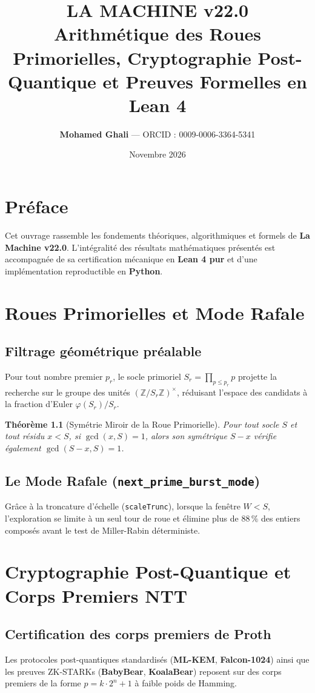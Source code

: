 \documentclass[11pt,a4paper,openany]{book}
\title{\Huge \textbf{LA MACHINE v22.0}\\[0.4cm]
\Large Arithmétique des Roues Primorielles, Cryptographie Post-Quantique et Preuves Formelles en Lean 4}
\author{\textbf{Mohamed Ghali} — ORCID : 0009-0006-3364-5341}
\date{Novembre 2026}
\newtheorem{theoreme}{Théorème}[chapter]
\begin{document}
\frontmatter
\maketitle
\tableofcontents
\mainmatter


\chapter*{Préface}
Cet ouvrage rassemble les fondements théoriques, algorithmiques et formels de \textbf{La Machine v22.0}. L'intégralité des résultats mathématiques présentés est accompagnée de sa certification mécanique en \textbf{Lean 4 pur} et d'une implémentation reproductible en \textbf{Python}.

\chapter{Roues Primorielles et Mode Rafale}
\section{Filtrage géométrique préalable}
Pour tout nombre premier $p_r$, le socle primoriel $S_r = \prod_{p \le p_r} p$ projette la recherche sur le groupe des unités $(\mathbb{Z}/S_r\mathbb{Z})^\times$, réduisant l'espace des candidats à la fraction d'Euler $\varphi(S_r)/S_r$.

\begin{theoreme}[Symétrie Miroir de la Roue Primorielle]
Pour tout socle $S$ et tout résidu $x < S$, si $\gcd(x, S) = 1$, alors son symétrique $S - x$ vérifie également $\gcd(S - x, S) = 1$.
\end{theoreme}

\section{Le Mode Rafale (\texttt{next\_prime\_burst\_mode})}
Grâce à la troncature d'échelle (\texttt{scaleTrunc}), lorsque la fenêtre $W < S$, l'exploration se limite à un seul tour de roue et élimine plus de $88\,\%$ des entiers composés avant le test de Miller-Rabin déterministe.
\chapter{Cryptographie Post-Quantique et Corps Premiers NTT}

\section{Certification des corps premiers de Proth}
Les protocoles post-quantiques standardisés (\textbf{ML-KEM}, \textbf{Falcon-1024}) ainsi que les preuves ZK-STARKs (\textbf{BabyBear}, \textbf{KoalaBear}) reposent sur des corps premiers de la forme $p = k \cdot 2^n + 1$ à faible poids de Hamming.
\end{document}
